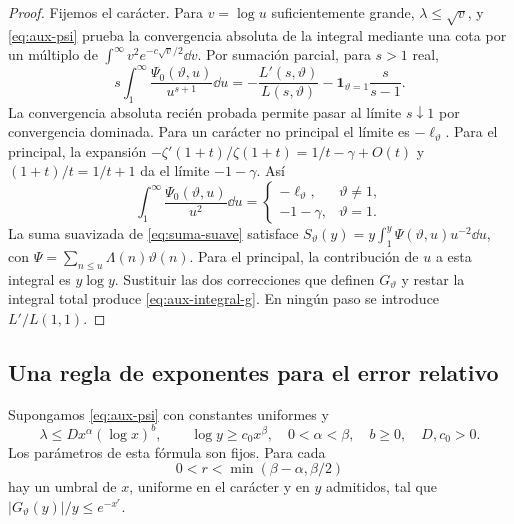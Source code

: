 \begin{proof}
Fijemos el carácter. Para $v=\log u$ suficientemente grande,
$\lambda\le\sqrt v$, y \eqref{eq:aux-psi} prueba la convergencia
absoluta de la integral mediante una cota por un múltiplo de
$\int^\infty v^2e^{-c\sqrt v/2}\dd v$.
Por sumación parcial, para $s>1$ real,
\[
 s\int_1^\infty\frac{\Psi_0(\vartheta,u)}{u^{s+1}}\dd u
 =-\frac{L'(s,\vartheta)}{L(s,\vartheta)}
                  -\mathbf1_{\vartheta=1}\frac{s}{s-1}.
\]
La convergencia absoluta recién probada permite pasar al límite
$s\downarrow1$ por convergencia dominada. Para un carácter no principal
el límite es $-\ell_\vartheta$.
Para el principal, la expansión
$-\zeta'(1+t)/\zeta(1+t)=1/t-\gamma+O(t)$ y
$(1+t)/t=1/t+1$ da el límite $-1-\gamma$.
Así
\[
 \int_1^\infty\frac{\Psi_0(\vartheta,u)}{u^2}\dd u
 =\begin{cases}-\ell_\vartheta,&\vartheta\ne1,\\
               -1-\gamma,&\vartheta=1.\end{cases}
\]
La suma suavizada de \eqref{eq:suma-suave} satisface
$S_\vartheta(y)=y\int_1^y\Psi(\vartheta,u)u^{-2}\dd u$,
con $\Psi=\sum_{n\le u}\Lambda(n)\vartheta(n)$.
Para el principal, la contribución de $u$ a esta integral es
$y\log y$. Sustituir las dos correcciones que definen $G_\vartheta$
y restar la integral total produce \eqref{eq:aux-integral-g}.
En ningún paso se introduce $L'/L(1,1)$.
\end{proof}

\subsection{Una regla de exponentes para el error relativo}

\begin{proposicion}
\label{prop:aux-delgada}
Supongamos \eqref{eq:aux-psi} con constantes uniformes y
\begin{equation}
 \lambda\le D x^\alpha(\log x)^b,\qquad
 \log y\ge c_0x^\beta,
 \quad 0<\alpha<\beta,\quad b\ge0,\quad D,c_0>0.
 \label{eq:aux-escala-general}
\end{equation}
Los parámetros de esta fórmula son fijos. Para cada
\begin{equation}
 0<r<\min(\beta-\alpha,\beta/2)
 \label{eq:aux-rango-r}
\end{equation}
hay un umbral de $x$, uniforme en el carácter y en $y$ admitidos,
tal que $|G_\vartheta(y)|/y\le e^{-x^r}$.
\end{proposicion}

